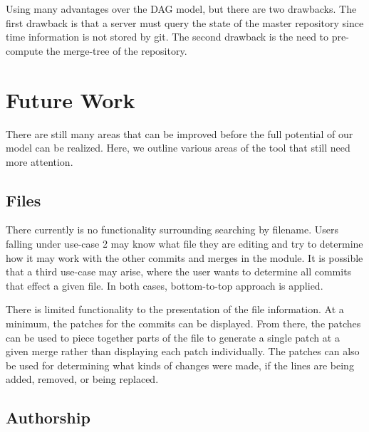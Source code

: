 \documentclass[conference, draftclsnofoot, draft]{IEEEtran}
\begin{document}
Using \tool many advantages over the DAG model, but there are two
drawbacks. The first drawback is that a server must query the state of the master
repository since time information is not stored by git. The second drawback is the
need to pre-compute the merge-tree of the repository.



\section{Future Work}

There are still many areas that can be improved before the full potential of our
model can be realized. Here, we outline various areas of the tool that still need
more attention.

\subsection{Files}

There currently is no functionality surrounding searching by filename. Users falling
under use-case 2 may know what file they are editing and try to determine how it may
work with the other commits and merges in the module. It is possible that a third
use-case may arise, where the user wants to determine all commits that effect a
given file. In both cases, bottom-to-top approach is applied.

There is limited functionality to the presentation of the file information. At a
minimum, the patches for the commits can be displayed. From there, the patches can
be used to piece together parts of the file to generate a single patch at a given
merge rather than displaying each patch individually. The patches can also be used
for determining what kinds of changes were made, if the lines are being added,
removed, or being replaced.

\subsection{Authorship}
\end{document}
